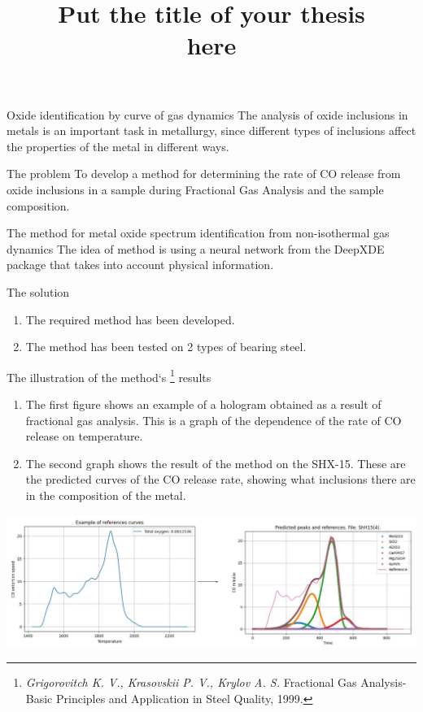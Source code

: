 \documentclass[12pt,pdf,hyperref={unicode}]{beamer}
\title{ Put the title of your thesis \\ here}
\begin{document}
\setcounter{page}{2}%
\begin{frame}{Oxide identification by curve of gas dynamics}
\small{The analysis of oxide inclusions in metals is an important task in metallurgy, since different types of inclusions affect the properties of the metal in different ways.}
\begin{block}{The problem}
\small{To develop a method for determining the rate of CO release from oxide inclusions in a sample during Fractional Gas Analysis and the sample composition.}
\end{block}
\begin{block}{The method for metal oxide spectrum identification from non-isothermal gas dynamics}
The idea of method is using a neural network from the DeepXDE package that takes into account physical information.
\end{block}
\begin{block}{The solution}
\begin{enumerate}[1)]
\item The required method has been developed.
\item The method has been tested on 2 types of bearing steel.
\end{enumerate}
\end{block}
\end{frame}
\begin{frame}{The illustration of the method`s%
\footnote{\textit{Grigorovitch K. V., Krasovskii P. V., Krylov A. S.}  Fractional Gas Analysis-Basic Principles and Application in Steel Quality, 1999.} results}

\begin{enumerate}[1)]
    \item \small{The first figure shows an example of a hologram obtained as a result of fractional gas analysis. This is a graph of the dependence of the rate of CO release on temperature. }
    \item \small{The second graph shows the result of the method  on the SHX-15. These are the predicted curves of the CO release rate, showing what inclusions there are in the composition of the metal.}
\end{enumerate}
\includegraphics[width=1\textwidth]{graf-Step-3-fig.png}
\bigskip
\end{frame}
\end{document}
